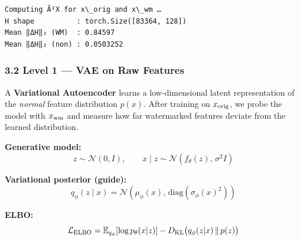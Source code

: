 \documentclass[11pt]{article}
\begin{document}
    \begin{Verbatim}[commandchars=\\\{\}]
Computing Ã²X for x\_orig and x\_wm …
H shape          : torch.Size([83364, 128])
Mean ‖ΔH‖₂ (WM)  : 0.84597
Mean ‖ΔH‖₂ (non) : 0.0503252
    \end{Verbatim}

    \subsubsection{3.2 Level 1 --- VAE on Raw
Features}\label{level-1-vae-on-raw-features}

A \textbf{Variational Autoencoder} learns a low-dimensional latent
representation of the \emph{normal} feature distribution \(p(x)\). After
training on \(x_{\rm orig}\), we probe the model with \(x_{\rm wm}\) and
measure how far watermarked features deviate from the learned
distribution.

\textbf{Generative model:} \[
z \sim \mathcal{N}(0, I), \qquad
x \mid z \sim \mathcal{N}(f_\theta(z),\, \sigma^2 I)
\]

\textbf{Variational posterior (guide):} \[
q_\phi(z \mid x) = \mathcal{N}\!\left(\mu_\phi(x),\, \mathrm{diag}(\sigma_\phi(x)^2)\right)
\]

\textbf{ELBO:} \[
\mathcal{L}_{\rm ELBO} = \mathbb{E}_{q_\phi}[\log p_\theta(x|z)]
- D_{\rm KL}\bigl(q_\phi(z|x)\,\|\,p(z)\bigr)
\]
\end{document}
